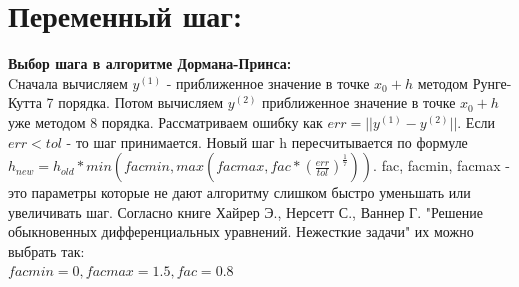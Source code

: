 \documentclass[12pt, a4paper] {report}
\theoremstyle{remark}
\theoremstyle{definition}
\begin{document}
\section{Переменный шаг:}

\textbf{Выбор шага в алгоритме Дормана-Принса:}\\
Cначала вычисляем $y^{(1)}$ - приближенное значение в точке $x_0 + h$ методом Рунге-Кутта 7 порядка. Потом вычисляем $y^{(2)}$ приближенное значение в точке $x_0 + h$ уже методом 8 порядка. Рассматриваем ошибку как $err = || y^{(1)} - y^{(2)}||$. Если $err < tol$ - то шаг принимается. Новый шаг h пересчитывается по формуле $h_{new} = h_{old}*min(facmin, max(facmax, fac*(\frac{err}{tol})^\frac{1}{7}))$. fac, facmin, facmax - это параметры которые не дают алгоритму слишком быстро уменьшать или увеличивать шаг. Согласно книге Хайрер Э., Нерсетт С., Ваннер Г. "Решение обыкновенных дифференциальных уравнений. Нежесткие задачи"  их можно выбрать так:\\
$facmin = 0, facmax = 1.5, fac = 0.8$\\
\end{document}
